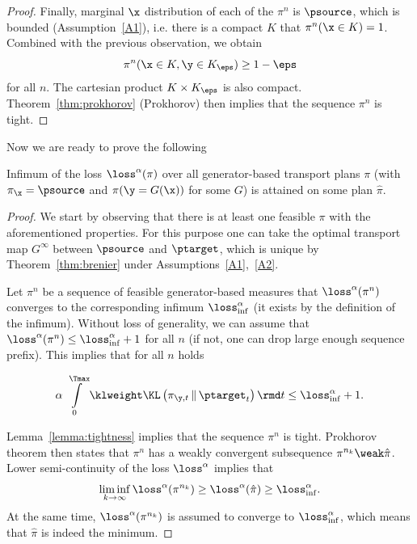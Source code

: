 \begin{proof}
    Finally, marginal $\x$ distribution of each of the $\pi^{n}$ is $\psource$, which is bounded (Assumption~\ref{A1}), i.e. there is a compact $K$ that $\pi^n(\x \in K) = 1$. Combined with the previous observation, we obtain
    \begin{equation}
        \pi^n(\x \in K, \y \in K_\eps) \geq 1 - \eps
    \end{equation}
    for all $n$. The cartesian product $K \times K_\eps$ is also compact. Theorem~\ref{thm:prokhorov} (Prokhorov) then implies that the sequence $\pi^n$ is tight.
\end{proof}

Now we are ready to prove the following
\begin{lemma}
    Infimum of the loss $\loss^\alpha(\pi)$ over all generator-based transport plans $\pi$ (with $\pi_{\x} = \psource$ and $\pi(\y = G(\x))$ for some $G$) is attained on some plan $\hat{\pi}$.
\end{lemma}
\begin{proof}
    We start by observing that there is at least one feasible $\pi$ with the aforementioned properties. For this purpose one can take the optimal transport map $G^\infty$ between $\psource$ and $\ptarget$, which is unique by Theorem~\ref{thm:brenier} under Assumptions~\ref{A1},~\ref{A2}.

    Let $\pi^n$ be a sequence of feasible generator-based measures that $\loss^\alpha(\pi^n)$ converges to the corresponding infimum $\loss^\alpha_{\inf}$ (it exists by the definition of the infimum). Without loss of generality, we can assume that $\loss^\alpha(\pi^n) \leq \loss^\alpha_{\inf} + 1$ for all $n$ (if not, one can drop large enough sequence prefix). This implies that for all $n$ holds

    \begin{equation}\alpha\, \int\limits_{0}^{\Tmax} \klweight \KL\left(\pi_{\y, t} \,\|\, \ptarget_t\right) \rmd t \leq \loss^\alpha_{\inf} + 1.
    \end{equation}

    Lemma~\ref{lemma:tightness} implies that the sequence $\pi^n$ is tight. Prokhorov theorem then states that $\pi^n$ has a weakly convergent subsequence $\pi^{n_k} \weak \hat{\pi}$. Lower semi-continuity of the loss $\loss^\alpha$ implies that
    \begin{equation}
        \liminf\limits_{k \rightarrow \infty} \loss^\alpha(\pi^{n_k}) \geq \loss^\alpha(\hat{\pi}) \geq \loss^\alpha_{\inf}.
    \end{equation}
    At the same time, $\loss^\alpha(\pi^{n_k})$ is assumed to converge to $\loss^\alpha_{\inf}$, which means that $\hat{\pi}$ is indeed the minimum.
\end{proof}

